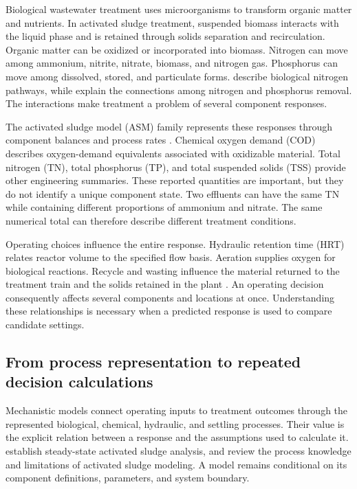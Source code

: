 Biological wastewater treatment uses microorganisms to transform organic matter and nutrients. In activated sludge treatment, suspended biomass interacts with the liquid phase and is retained through solids separation and recirculation. Organic matter can be oxidized or incorporated into biomass. Nitrogen can move among ammonium, nitrite, nitrate, biomass, and nitrogen gas. Phosphorus can move among dissolved, stored, and particulate forms. \citet{Duan2022} describe biological nitrogen pathways, while \citet{Wentzel1992} explain the connections among nitrogen and phosphorus removal. The interactions make treatment a problem of several component responses.

The activated sludge model (ASM) family represents these responses through component balances and process rates \citep{Henze1987,Henze1999,Henze2006}. Chemical oxygen demand (COD) describes oxygen-demand equivalents associated with oxidizable material. Total nitrogen (TN), total phosphorus (TP), and total suspended solids (TSS) provide other engineering summaries. These reported quantities are important, but they do not identify a unique component state. Two effluents can have the same TN while containing different proportions of ammonium and nitrate. The same numerical total can therefore describe different treatment conditions.

Operating choices influence the entire response. Hydraulic retention time (HRT) relates reactor volume to the specified flow basis. Aeration supplies oxygen for biological reactions. Recycle and wasting influence the material returned to the treatment train and the solids retained in the plant \citep{Henze2008}. An operating decision consequently affects several components and locations at once. Understanding these relationships is necessary when a predicted response is used to compare candidate settings.

\subsection{From process representation to repeated decision calculations}

Mechanistic models connect operating inputs to treatment outcomes through the represented biological, chemical, hydraulic, and settling processes. Their value is the explicit relation between a response and the assumptions used to calculate it. \citet{Marais1976} establish steady-state activated sludge analysis, and \citet{Hauduc2013} review the process knowledge and limitations of activated sludge modeling. A model remains conditional on its component definitions, parameters, and system boundary.

